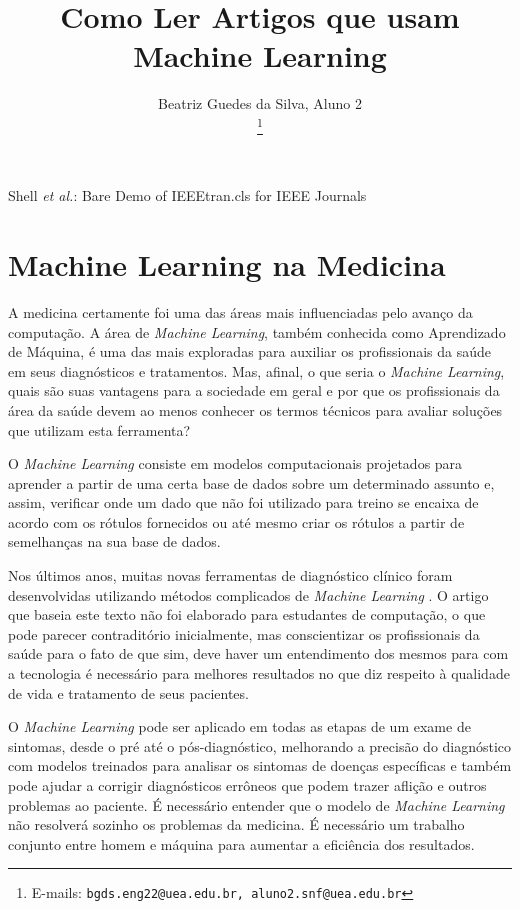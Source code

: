 \documentclass[journal]{IEEEtran}
\begin{document}
\title{Como Ler Artigos que usam Machine Learning}


\author{Beatriz Guedes da Silva, Aluno 2\\
\thanks{E-mails: \texttt{bgds.eng22@uea.edu.br, aluno2.snf@uea.edu.br}}}

%
{Shell \MakeLowercase{\textit{et al.}}: Bare Demo of IEEEtran.cls for IEEE Journals}
\maketitle
\IEEEpeerreviewmaketitle

\section{Machine Learning na Medicina}

A medicina certamente foi uma das áreas mais influenciadas pelo avanço da computação. A área de \emph{Machine Learning}, também conhecida como Aprendizado de Máquina, é uma das mais exploradas para auxiliar os profissionais da saúde em seus diagnósticos e tratamentos. Mas, afinal, o que seria o \emph{Machine Learning}, quais são suas vantagens para a sociedade em geral e por que os profissionais da área da saúde devem ao menos conhecer os termos técnicos para avaliar soluções que utilizam esta ferramenta?

O \emph{Machine Learning} consiste em modelos computacionais projetados para aprender a partir de uma certa base de dados sobre um determinado assunto e, assim, verificar onde um dado que não foi utilizado para treino se encaixa de acordo com os rótulos fornecidos ou até mesmo criar os rótulos a partir de semelhanças na sua base de dados.

Nos últimos anos, muitas novas ferramentas de diagnóstico clínico foram desenvolvidas utilizando métodos complicados de \emph{Machine Learning} \cite{Liu2019}. O artigo que baseia este texto não foi elaborado para estudantes de computação, o que pode parecer contraditório inicialmente, mas conscientizar os profissionais da saúde para o fato de que sim, deve haver um entendimento dos mesmos para com a tecnologia é necessário para melhores resultados no que diz respeito à qualidade de vida e tratamento de seus pacientes.

O \emph{Machine Learning} pode ser aplicado em todas as etapas de um exame de sintomas, desde o pré até o pós-diagnóstico, melhorando a precisão do diagnóstico com modelos treinados para analisar os sintomas de doenças específicas e também pode ajudar a corrigir diagnósticos errôneos que podem trazer aflição e outros problemas ao paciente. É necessário entender que o modelo de \emph{Machine Learning} não resolverá sozinho os problemas da medicina. É necessário um trabalho conjunto entre homem e máquina para aumentar a eficiência dos resultados.
\end{document}
